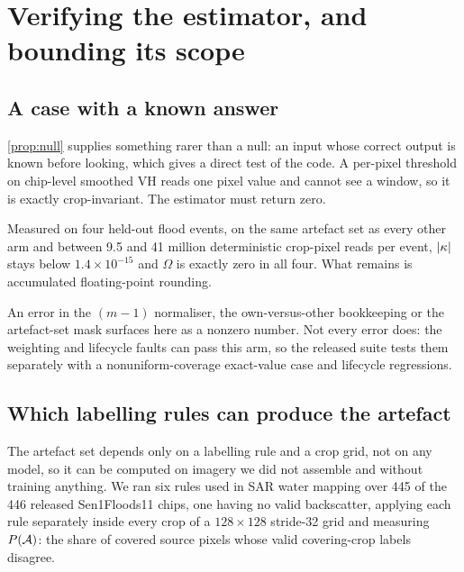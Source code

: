 \section{Verifying the estimator, and bounding its scope}
\label{sec:verify}

\subsection{A case with a known answer}

\cref{prop:null} supplies something rarer than a null: an input whose correct output
is known before looking, which gives a direct test of the code. A
per-pixel threshold on chip-level smoothed VH reads one pixel value and cannot see a
window, so it is exactly crop-invariant. The estimator
must return zero.

Measured on four held-out flood events, on the same artefact set as every other arm
and between 9.5 and 41 million deterministic crop-pixel reads per event, $|\kappa|$ stays below
$1.4 \times 10^{-15}$ and $\Omega$ is exactly zero in all four. What remains is accumulated
floating-point rounding.

An error in the $(m-1)$ normaliser, the own-versus-other bookkeeping or the
artefact-set mask surfaces here as a nonzero number. Not every error does: the
weighting and lifecycle faults can pass this arm, so the released suite tests
them separately with a nonuniform-coverage exact-value case and lifecycle
regressions.

\subsection{Which labelling rules can produce the artefact}
\label{sec:survey}

The artefact set depends only on a labelling rule and a crop grid, not on any model,
so it can be computed on imagery we did not assemble and without training anything.
We ran six rules used in SAR water mapping over 445 of the 446 released Sen1Floods11
chips, one having no valid backscatter, applying each rule separately inside every
crop of a $128 \times 128$ stride-32 grid and measuring $P(\mathcal{A})$: the share of
covered source pixels whose valid covering-crop labels disagree.

